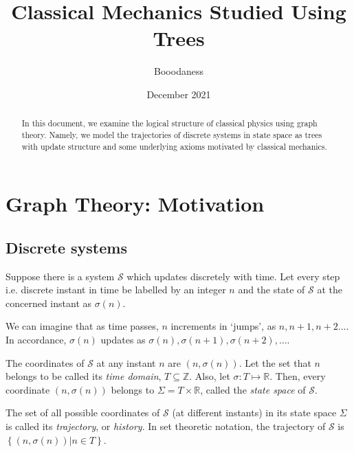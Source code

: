 \documentclass[12 pt]{article}
\title{Classical Mechanics Studied Using Trees}
\author{Booodaness}
\date{December 2021}
\begin{document}

\begin{titlepage}
\maketitle
\begin{abstract}
In this document, we examine the logical structure of classical physics using graph theory. Namely, we model the trajectories of discrete systems in state space as trees with update structure and some underlying axioms motivated by classical mechanics.
\end{abstract}
\end{titlepage}

\setcounter{page}{2}

\tableofcontents

\clearpage
{}

\section{Graph Theory: Motivation}

\subsection{Discrete systems}

Suppose there is a system $\mathcal{S}$ which updates discretely with time. Let every step i.e. discrete instant in time be labelled by an integer $n$ and the state of $\mathcal{S}$ at the concerned instant as $\sigma \left( n \right)$.

We can imagine that as time passes, $n$ increments in `jumps', as $n, n+1, n+2 \dots$. In accordance, $\sigma \left( n \right)$ updates as $\sigma \left( n \right), \sigma \left( n+1 \right), \sigma \left( n+2 \right), \dots$.

The coordinates of $\mathcal{S}$ at any instant $n$ are $\left( n, \sigma \left( n \right) \right)$. Let the set that $n$ belongs to be called its \emph{time domain}, $T \subseteq \mathbb{Z}$. Also, let $\sigma : T \mapsto \mathbb{R}$. Then, every coordinate $\left( n, \sigma \left( n \right) \right)$ belongs to $\Sigma = T \times \mathbb{R}$, called the \emph{state space} of $\mathcal{S}$.

The set of all possible coordinates of $\mathcal{S}$ (at different instants) in its state space $\Sigma$ is called its \emph{trajectory}, or \emph{history}. In set theoretic notation, the trajectory of $\mathcal{S}$ is $\left\{ \left( n, \sigma \left( n \right) \right) \vert n \in T \right\}$.
\end{document}
